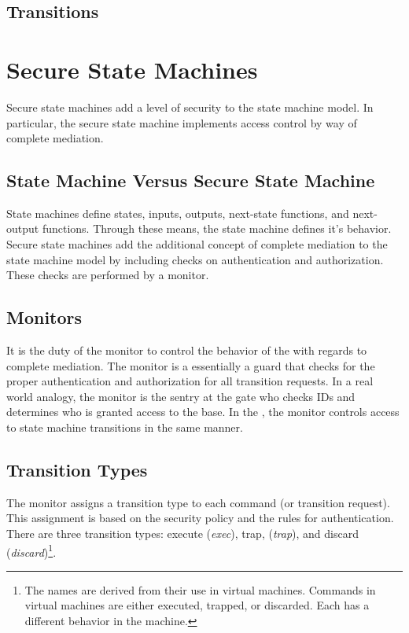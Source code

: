 \documentclass[../../main/main.tex]{subfiles}
\begin{document}
\subsection{Transitions}


\section{Secure State Machines}\label{sec:ssm}
Secure state machines add a level of security to the state machine model.  In particular, the secure state machine implements access control by way of complete mediation.   

\subsection{State Machine Versus Secure State Machine}
State machines define states, inputs, outputs, next-state functions, and next-output functions.  Through these means, the state machine defines it's behavior.  Secure state machines add the additional concept of complete mediation to the state machine model by including checks on authentication and authorization.  These checks are performed by a monitor.

 
\subsection{Monitors}\label{monitors}
It is the duty of the monitor to control the behavior of the  with regards to complete mediation.  The monitor is a essentially a guard that checks for the proper authentication and authorization for all  transition requests.  In a real world analogy, the monitor is the sentry at the gate who checks IDs and determines who is granted access to the base.  In the , the monitor controls access to state machine transitions in the same manner.

\subsection{Transition Types}
The monitor assigns a transition type to each command (or  transition request). This assignment is based on the security policy and the rules for authentication.  There are three transition types: execute (\textit{exec}), trap, (\textit{trap}), and discard (\textit{discard})\footnote{The names are derived from their use in virtual machines.  Commands in virtual machines are either executed, trapped, or discarded.  Each has a different behavior in the machine.}.  
\end{document}
